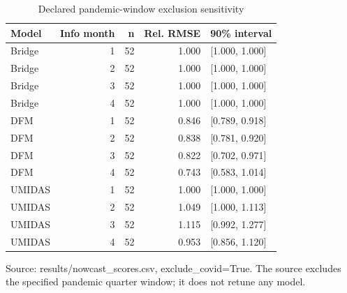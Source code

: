 \begin{table}[htbp]
\centering
\footnotesize
\caption{Declared pandemic-window exclusion sensitivity}
\begin{tabularx}{\linewidth}{XrrrX}
\toprule
Model & Info month & n & Rel. RMSE & 90\% interval \\
\midrule
Bridge & 1 & 52 & 1.000 & [1.000, 1.000] \\
Bridge & 2 & 52 & 1.000 & [1.000, 1.000] \\
Bridge & 3 & 52 & 1.000 & [1.000, 1.000] \\
Bridge & 4 & 52 & 1.000 & [1.000, 1.000] \\
DFM & 1 & 52 & 0.846 & [0.789, 0.918] \\
DFM & 2 & 52 & 0.838 & [0.781, 0.920] \\
DFM & 3 & 52 & 0.822 & [0.702, 0.971] \\
DFM & 4 & 52 & 0.743 & [0.583, 1.014] \\
UMIDAS & 1 & 52 & 1.000 & [1.000, 1.000] \\
UMIDAS & 2 & 52 & 1.049 & [1.000, 1.113] \\
UMIDAS & 3 & 52 & 1.115 & [0.992, 1.277] \\
UMIDAS & 4 & 52 & 0.953 & [0.856, 1.120] \\
\bottomrule
\end{tabularx}
\par\vspace{3pt}\begin{minipage}{\linewidth}\footnotesize Source: results/nowcast\_\allowbreak{}scores.\allowbreak{}csv, exclude\_\allowbreak{}covid=True.\allowbreak{} The source excludes the specified pandemic quarter window; it does not retune any model.\allowbreak{}\end{minipage}
\end{table}
